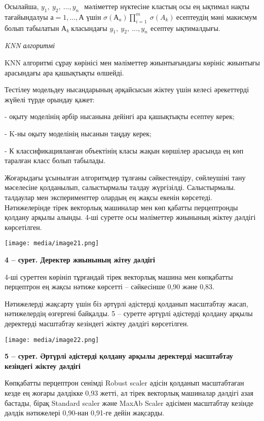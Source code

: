 \documentclass[
]{article}
\begin{document}
Осылайша, \(y_{1},\ y_{2},\ ...,y_{n\ }\ \) мәліметтер нүктесіне кластың
осы ең ықтимал нақты тағайындалуы \(а = 1,\ldots,А\) үшін
\(\sigma\left( А_{a} \right)\prod_{i = 1}^{m}{}\ \sigma\left( A_{k} \right)\ \)есептеудің
мәні макисмум болып табылатын \(А_{k}\ \)класындағы
\(y_{1},\ y_{2},\ ...,y_{n\ }\ \)есептеу ықтималдығы.

\emph{KNN алгоритмі}

KNN алгоритмі сұрау көрінісі мен мәліметтер жиынтығындағы көрініс
жиынтығы арасындағы ара қашықтықты өлшейді.

Тестілеу модельдеу нысандарының әрқайсысын жіктеу үшін келесі
әрекеттерді жүйелі түрде орындау қажет:

- оқыту моделінің әрбір нысанына дейінгі ара қашықтықты есептеу керек;

- K-ны оқыту моделінің нысанын таңдау керек;

- К классификацияланған объектінің класы жақын көршілер арасында ең көп
таралған класс болып табылады.

Жоғарыдағы ұсынылған алгоритмдер тұлғаны сәйкестендіру, сөйлеушіні тану
мәселесіне қолданылып, салыстырмалы талдау жүргізілді. Салыстырмалы.
талдаулар мен эксперименттер олардың ең жақсы екенін көрсетеді.
Нәтижелерінде тірек векторлық машиналар мен көп қабатты перцептронды
қолдану арқылы алынды. 4-ші суретте осы мәліметтер жиынының жіктеу
дәлдігі көрсетілген.

\texttt{[image: media/image21.png]}

\textbf{4 -- сурет. Деректер жиынының жітеу дәлдігі}

4-ші суреттен көрініп тұрғандай тірек векторлық машина мен көпқабатты
перцептрон ең жақсы нәтиже көрсетті -- сәйкесінше 0,90 және 0,83.

Нәтижелерді жақсарту үшін біз әртүрлі әдістерді қолданып масштабтау
жасап, нәтижелердің өзгергені байқалды. 5 -- суретте әртүрлі әдістерді
қолдану арқылы деректерді масштабтау кезіндегі жіктеу дәлдігі
көрсетілген.

\texttt{[image: media/image22.png]}

\textbf{5 -- сурет. Әртүрлі әдістерді қолдану арқылы деректерді
масштабтау кезіндегі жіктеу дәлдігі}

Көпқабатты перцептрон сенімді Robust scaler әдісін қолданып масштабтаған
кезде ең жоғары дәлдікке 0,93 жетті, ал тірек векторлық машиналар
дәлдігі азая бастады, бірақ Standard scaler және MaxAb Scaler әдісімен
масштабтау кезінде дәлдік нәтижелері 0,90-нан 0,91-ге дейін жақсарды.
\end{document}

